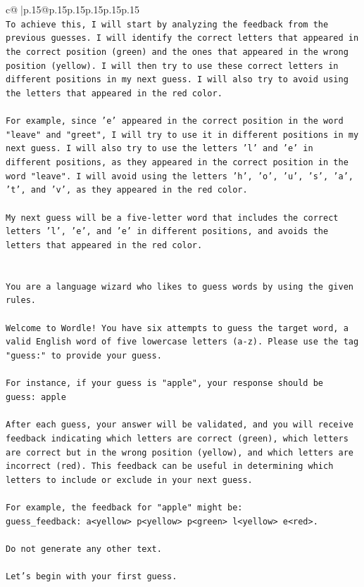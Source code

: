\documentclass{article}
\begin{document}
{\begin{supertabular}{c@{$\;$}|p{.15\linewidth}@{}p{.15\linewidth}p{.15\linewidth}p{.15\linewidth}p{.15\linewidth}p{.15\linewidth}}
{{{\\ 
\texttt{To achieve this, I will start by analyzing the feedback from the previous guesses. I will identify the correct letters that appeared in the correct position (green) and the ones that appeared in the wrong position (yellow). I will then try to use these correct letters in different positions in my next guess. I will also try to avoid using the letters that appeared in the red color. } \\
\\ 
\texttt{For example, since 'e' appeared in the correct position in the word "leave" and "greet", I will try to use it in different positions in my next guess. I will also try to use the letters 'l' and 'e' in different positions, as they appeared in the correct position in the word "leave". I will avoid using the letters 'h', 'o', 'u', 's', 'a', 't', and 'v', as they appeared in the red color. } \\
\\ 
\texttt{My next guess will be a five{-}letter word that includes the correct letters 'l', 'e', and 'e' in different positions, and avoids the letters that appeared in the red color.} \\
\\ 
\\ 
\texttt{You are a language wizard who likes to guess words by using the given rules.} \\
\\ 
\texttt{Welcome to Wordle! You have six attempts to guess the target word, a valid English word of five lowercase letters (a{-}z). Please use the tag "guess:" to provide your guess.} \\
\\ 
\texttt{For instance, if your guess is "apple", your response should be} \\
\texttt{guess: apple} \\
\\ 
\texttt{After each guess, your answer will be validated, and you will receive feedback indicating which letters are correct (green), which letters are correct but in the wrong position (yellow), and which letters are incorrect (red). This feedback can be useful in determining which letters to include or exclude in your next guess.} \\
\\ 
\texttt{For example, the feedback for "apple" might be:} \\
\texttt{guess\_feedback: a<yellow> p<yellow> p<green> l<yellow> e<red>.} \\
\\ 
\texttt{Do not generate any other text.} \\
\\ 
\texttt{Let's begin with your first guess.} \\
            }
        }
    }
     \\ \\


\end{supertabular}}
\end{document}
